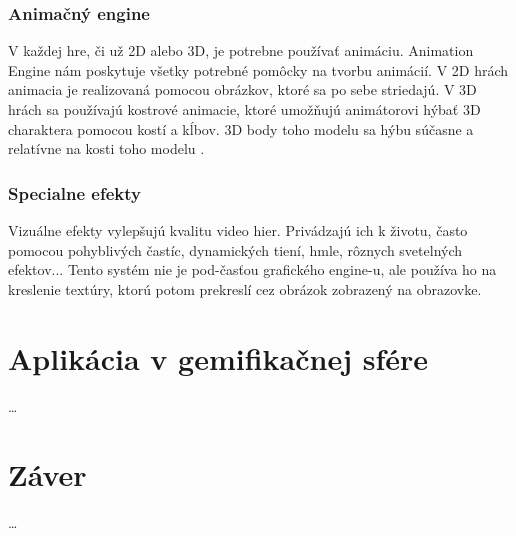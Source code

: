 \documentclass[10pt,oneside,slovak,a4paper,hidelinks]{article}
\begin{document}
		\subsubsection{Animačný engine}
			V každej hre, či už 2D alebo 3D, je potrebne používať animáciu. Animation Engine nám poskytuje všetky potrebné pomôcky na tvorbu animácií. V 2D hrách animacia je realizovaná pomocou obrázkov, ktoré sa po sebe striedajú. V 3D hrách sa používajú kostrové animacie, ktoré umožňujú animátorovi hýbať 3D charaktera pomocou kostí a kĺbov. 3D body toho modelu sa hýbu súčasne a relatívne na kosti toho modelu \cite{Secondary}.
		\subsubsection{Specialne efekty}
			Vizuálne efekty vylepšujú kvalitu video hier. Privádzajú ich k životu, často pomocou pohyblivých častíc, dynamických tiení, hmle, rôznych svetelných efektov... Tento systém nie je pod-časťou grafického engine-u, ale používa ho na kreslenie textúry, ktorú potom prekreslí cez obrázok zobrazený na obrazovke.
	\section{Aplikácia v gemifikačnej sfére}
		\ldots
	\section{Záver}
		\ldots
	
	
	
	
	
\end{document}

